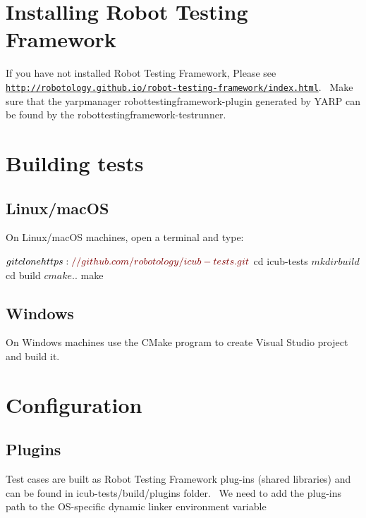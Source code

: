 \hypertarget{installation_installing_robottestingframework}{}\section{Installing Robot Testing Framework}\label{installation_installing_robottestingframework}
If you have not installed Robot Testing Framework, Please see \href{http://robotology.github.io/robot-testing-framework/index.html}{\tt http\+://robotology.\+github.\+io/robot-\/testing-\/framework/index.\+html}.~\newline
Make sure that the {\ttfamily yarpmanager} robottestingframework-\/plugin generated by Y\+A\+RP can be found by the {\ttfamily robottestingframework-\/testrunner}.~\newline
\hypertarget{installation_building_tests}{}\section{Building tests}\label{installation_building_tests}
\hypertarget{installation_building_tests_unix}{}\subsection{Linux/mac\+OS}\label{installation_building_tests_unix}
On Linux/mac\+OS machines, open a terminal and type\+: 
\begin{DoxyCode}
$ git clone https:\textcolor{comment}{//github.com/robotology/icub-tests.git}
$ cd icub-tests
$ mkdir build
$ cd build
$ cmake ..
$ make
\end{DoxyCode}
\hypertarget{installation_building_tests_win}{}\subsection{Windows}\label{installation_building_tests_win}
On Windows machines use the C\+Make program to create Visual Studio project and build it.\hypertarget{installation_configuration}{}\section{Configuration}\label{installation_configuration}
\hypertarget{installation_plugins}{}\subsection{Plugins}\label{installation_plugins}
Test cases are built as Robot Testing Framework plug-\/ins (shared libraries) and can be found in {\ttfamily icub-\/tests/build/plugins} folder.~\newline
We need to add the plug-\/ins path to the O\+S-\/specific dynamic linker environment variable

